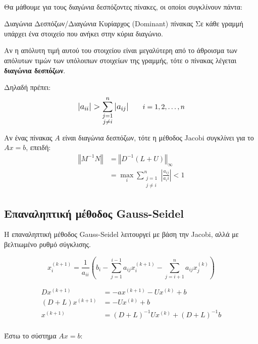 \documentclass[11pt,a4paper,notitlepage,fleqn]{article}
\begin{document}
\paragraph{}
Θα μάθουμε για τους διαγώνια δεσπόζοντες πίνακες, οι οποίοι
συγκλίνουν πάντα:
\begin{defn}{Διαγώνια Δεσπόζων/Διαγώνια Κυρίαρχος (Dominant) πίνακας}{}
	Σε κάθε γραμμή υπάρχει ένα στοιχείο που ανήκει στην κύρια διαγώνιο.
	
	Αν η απόλυτη τιμή αυτού του στοιχείου είναι μεγαλύτερη από
    το άθροισμα των απόλυτων τιμών των υπόλοιπων στοιχείων της γραμμής,
    τότε ο πίνακας λέγεται \textbf{διαγώνια δεσπόζων}.
    
    Δηλαδή πρέπει:
    \[
    \mathlarger{
        \left|a_{ii}\right| > \sum_{\substack{j=1\\j\neq i}}^{n}
        \left|a_{ij}\right|
}   \qquad i=1,2,\dots,n
    \]
\end{defn}

Αν ένας πίνακας \( A \) είναι διαγώνια δεσπόζων, τότε η μέθοδος Jacobi
συγκλίνει για το \( Ax = b \), επειδή:
\begin{align*}
	\left\Vert M^{-1}N \right\Vert &=
	\left\Vert D^{-1} (L+U) \right\Vert_{\infty} \\
	&= \max_i \sum_{\substack{j=1\\j\neq i}}^{n}
	 \left|\frac{a_{ij}}{a_ii}\right| < 1
\end{align*}

\subsection{Επαναληπτική μέθοδος Gauss-Seidel}
Η επαναληπτική μέθοδος Gauss-Seidel λειτουργεί με βάση την Jacobi, αλλά
με βελτιωμένο ρυθμό σύγκλισης.

\[
x_i^{(k+1)} = \frac{1}{a_{ii}}\left(
b_i - \sum_{j=1}^{i-1}a_{ij}x_i^{(k+1)}
- \sum_{j=i+1}^{n} a_{ij}x_j^{(k)}
\right)
\]

\begin{align*}
	Dx^{(k+1)} &= -ax^{(k+1)} - Ux^{(k)}+b \\
	(D+L)x^{(k+1)} &= -Ux^{(k)}+b \\
	x^{(k+1)} &= (D+L)^{-1}Ux^{(k)}+(D+L)^{-1}b
\end{align*}

\paragraph{}
Έστω το σύστημα \( Ax=b \):
\end{document}
